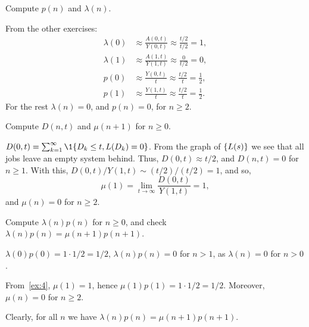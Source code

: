 \begin{exercise} \label{ex:113}
Compute
$p(n)$ and $\lambda(n)$.
\begin{solution}
 From the other exercises:
 \begin{align*}
 \lambda(0) &\approx \frac{A(0,t)}{Y(0,t)} \approx \frac{t/2}{t/2} = 1, \\
 \lambda(1) &\approx \frac{A(1,t)}{Y(1,t)} \approx \frac{0}{t/2} = 0, \\
 p(0) &\approx \frac{Y(0,t)}{t} \approx \frac{t/2}{t} = \frac 1 2, \\
 p(1) &\approx \frac{Y(1,t)}{t} \approx \frac{t/2}{t} = \frac 1 2.
 \end{align*}
For the rest $\lambda(n) = 0$, and $p(n)=0$, for $n\geq 2$.
\end{solution}
\end{exercise}


\begin{exercise}\label{ex:4}
Compute
$D(n,t)$ and $\mu(n+1)$ for $n\geq 0$.
\begin{solution}
 $D(0,t) = \sum_{k=1}^\infty\1{D_k\leq t, L(D_k)=0}$. From the graph of $\{L(s)\}$ we see that all jobs leave an empty system behind. Thus, $D(0,t) \approx t/2$, and $D(n,t)=0$ for $n\geq 1$. With this, $D(0,t)/Y(1,t) \sim (t/2)/(t/2) = 1$, and so,
 \begin{equation*}
 \mu(1) = \lim_{t\to\infty} \frac{D(0,t)}{Y(1, t)} = 1,
 \end{equation*}
and $\mu(n) = 0$ for $n\geq2$.
\end{solution}
\end{exercise}



\begin{exercise}\label{ex:l-110}
 Compute $\lambda(n) p(n)$ for $n\geq 0$, and check $\lambda(n) p(n) = \mu(n+1) p(n+1)$.
\begin{solution}
 $\lambda(0)p(0)=1\cdot 1/2 = 1/2$, $\lambda(n)p(n)= 0$ for $n>1$, as $\lambda(n)=0$ for $n>0$.

From~\cref{ex:4}, $\mu(1)=1$, hence $\mu(1) p(1) = 1\cdot 1/2 = 1/2$. Moreover, $\mu(n)=0$ for $n\geq 2$.

Clearly, for all $n$ we have $\lambda(n)p(n)= \mu(n+1)p(n+1)$.

\end{solution}
\end{exercise}


